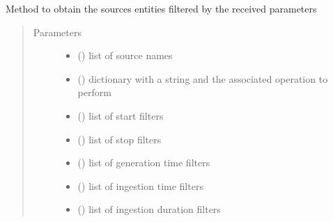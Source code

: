 \begin{fulllineitems}

\begin{fulllineitems}
\label{\detokenize{gsdm.engine:gsdm.engine.query.Query.get_sources}}
Method to obtain the sources entities filtered by the received parameters
\begin{quote}\begin{description}
\item[{Parameters}] \leavevmode\begin{itemize}
\item {} 
 () \textendash{} list of source names

\item {} 
 () \textendash{} dictionary with a string and the associated operation to perform

\item {} 
 () \textendash{} list of start filters

\item {} 
 () \textendash{} list of stop filters

\item {} 
 () \textendash{} list of generation time filters

\item {} 
 () \textendash{} list of ingestion time filters

\item {} 
 () \textendash{} list of ingestion duration filters


\end{itemize}
\end{description}
\end{quote}
\end{fulllineitems}
\end{fulllineitems}
